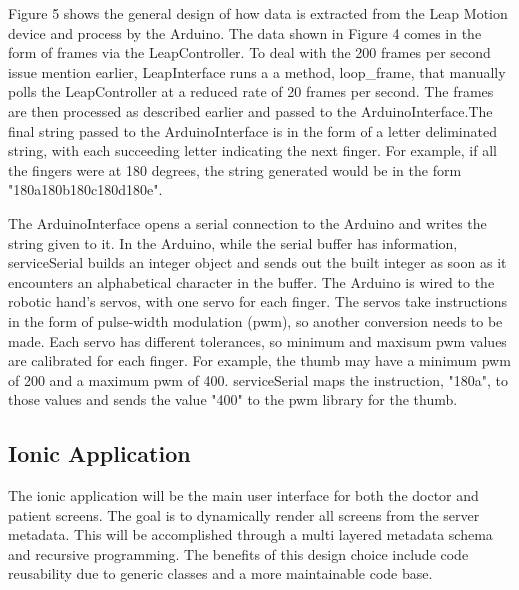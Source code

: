 \documentclass[a4paper,10pt]{article}
\begin{document}
            Figure 5 shows the general design of how data is extracted from the Leap Motion device and process by the Arduino. The data shown in Figure 4 comes in the form of frames via the LeapController. To deal with the 200 frames per second issue mention earlier, LeapInterface runs a a method, loop\_frame, that manually polls the LeapController at a reduced rate of 20 frames per second. The frames are then processed as described earlier and passed to the ArduinoInterface.The final string passed to the ArduinoInterface is in the form of a letter deliminated string, with each succeeding letter indicating the next finger. For example, if all the fingers were at 180 degrees, the string generated would be in the form "180a180b180c180d180e".

            The ArduinoInterface opens a serial connection to the Arduino and writes the string given to it. In the Arduino, while the serial buffer has information, serviceSerial builds an integer object and sends out the built integer as soon as it encounters an alphabetical character in the buffer. The Arduino is wired to the robotic hand's servos, with one servo for each finger. The servos take instructions in the form of pulse-width modulation (pwm), so another conversion needs to be made. Each servo has different tolerances, so minimum and maxisum pwm values are calibrated for each finger. For example, the thumb may have a minimum pwm of 200 and a maximum pwm of 400. serviceSerial maps the instruction, "180a", to those values and sends the value "400" to the pwm library for the thumb.
            
        \subsection{Ionic Application}
            The ionic application will be the main user interface for both the doctor and patient screens. The goal is to dynamically render all screens from the server metadata. This will be accomplished through a multi layered metadata schema and recursive programming. The benefits of this design choice include code reusability due to generic classes and a more maintainable code base. 
            
\end{document}
